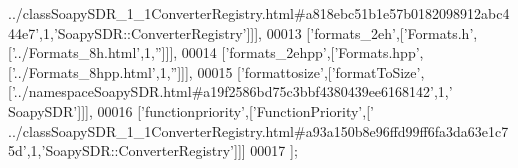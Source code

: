 \begin{DoxyCode}
{      ../classSoapySDR\_1\_1ConverterRegistry.html#a818ebc51b1e57b0182098912abc444e7'},1,\textcolor{stringliteral}{'SoapySDR::ConverterRegistry'}]]],
00013   [\textcolor{stringliteral}{'formats\_2eh'},[\textcolor{stringliteral}{'Formats.h'},[\textcolor{stringliteral}{'../Formats\_8h.html'},1,\textcolor{stringliteral}{''}]]],
00014   [\textcolor{stringliteral}{'formats\_2ehpp'},[\textcolor{stringliteral}{'Formats.hpp'},[\textcolor{stringliteral}{'../Formats\_8hpp.html'},1,\textcolor{stringliteral}{''}]]],
00015   [\textcolor{stringliteral}{'formattosize'},[\textcolor{stringliteral}{'formatToSize'},[\textcolor{stringliteral}{'../namespaceSoapySDR.html#a19f2586bd75c3bbf4380439ee6168142'},1,\textcolor{stringliteral}{'
      SoapySDR'}]]],
00016   [\textcolor{stringliteral}{'functionpriority'},[\textcolor{stringliteral}{'FunctionPriority'},[\textcolor{stringliteral}{'
      ../classSoapySDR\_1\_1ConverterRegistry.html#a93a150b8e96ffd99ff6fa3da63e1c75d'},1,\textcolor{stringliteral}{'SoapySDR::ConverterRegistry'}]]]
00017 ];
\end{DoxyCode}
